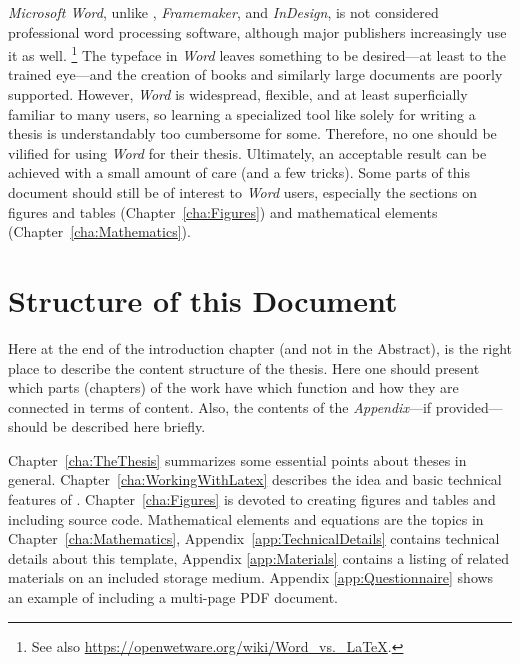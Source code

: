 \emph{Microsoft Word}, unlike \latex, \emph{Framemaker}, and \emph{InDesign},
is not considered professional word processing software, although major
publishers increasingly use it as well.%
\footnote{See also \url{https://openwetware.org/wiki/Word_vs._LaTeX}.}
The typeface in \emph{Word} leaves something to be desired---at least to the
trained eye---and the creation of books and similarly large documents are poorly
supported. However, \emph{Word} is widespread, flexible, and at least
superficially familiar to many users, so learning a specialized tool like \latex
solely for writing a thesis is understandably too cumbersome for some.
Therefore, no one should be vilified for using \emph{Word} for their thesis.
Ultimately, an acceptable result can be achieved with a small amount of care
(and a few tricks). Some parts of this document should still be of interest to
\emph{Word} users, especially the sections on figures and tables
(Chapter~\ref{cha:Figures}) and mathematical elements
(Chapter~\ref{cha:Mathematics}).


\section{Structure of this Document}

Here at the end of the introduction chapter (and not in the Abstract), is the
right place to describe the content structure of the thesis. Here one should
present which parts (chapters) of the work have which function and how they are
connected in terms of content. Also, the contents of the \emph{Appendix}---if
provided---should be described here briefly.

Chapter~\ref{cha:TheThesis} summarizes some essential points about theses in
general. Chapter~\ref{cha:WorkingWithLatex} describes the idea and basic
technical features of \latex. Chapter~\ref{cha:Figures} is devoted to creating
figures and tables and including source code. Mathematical elements and
equations are the topics in Chapter~\ref{cha:Mathematics}, \etc
Appendix~\ref{app:TechnicalDetails} contains technical details about this
template, Appendix \ref{app:Materials} contains a listing of related materials
on an included storage medium. Appendix \ref{app:Questionnaire} shows an
example of including a multi-page PDF document.
